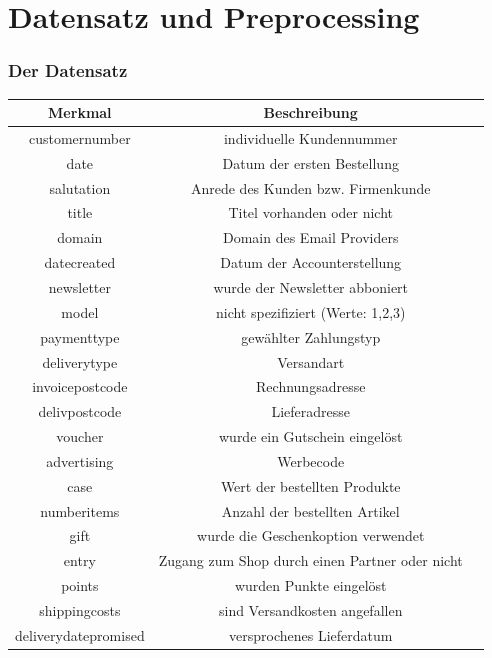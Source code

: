 \chapter{Datensatz und Preprocessing}
\label{chap:dapre}
\pagebreak
\begin{table}[]
\subsection{Der Datensatz}
\centering
\begin{tabular*}{\textwidth}{c @{\extracolsep{\fill}} cc}
\toprule
\textbf{Merkmal} & \textbf{Beschreibung} \\
\midrule
 customernumber & individuelle Kundennummer\\
 \hline
 date & Datum der ersten Bestellung\\
 \hline
 salutation & Anrede des Kunden bzw. Firmenkunde\\
 \hline
 title & Titel vorhanden oder nicht\\
 \hline
 domain & Domain des Email Providers\\
 \hline
 datecreated & Datum der Accounterstellung\\
 \hline
 newsletter & wurde der Newsletter abboniert\\
 \hline
 model & nicht spezifiziert (Werte: 1,2,3)\\
 \hline
 paymenttype & gewählter Zahlungstyp\\
 \hline
 deliverytype & Versandart\\
 \hline
 invoicepostcode & Rechnungsadresse\\
 \hline
 delivpostcode & Lieferadresse\\
 \hline
 voucher & wurde ein Gutschein eingelöst\\
 \hline
 advertising & Werbecode\\
 \hline
 case & Wert der bestellten Produkte\\
 \hline
 numberitems & Anzahl der bestellten Artikel\\
 \hline
 gift & wurde die Geschenkoption verwendet\\
 \hline
 entry & Zugang zum Shop durch einen Partner oder nicht\\
 \hline
 points & wurden Punkte eingelöst\\
 \hline
 shippingcosts & sind Versandkosten angefallen\\
 \hline
 deliverydatepromised & versprochenes Lieferdatum\\

\end{tabular*}
\end{table}
